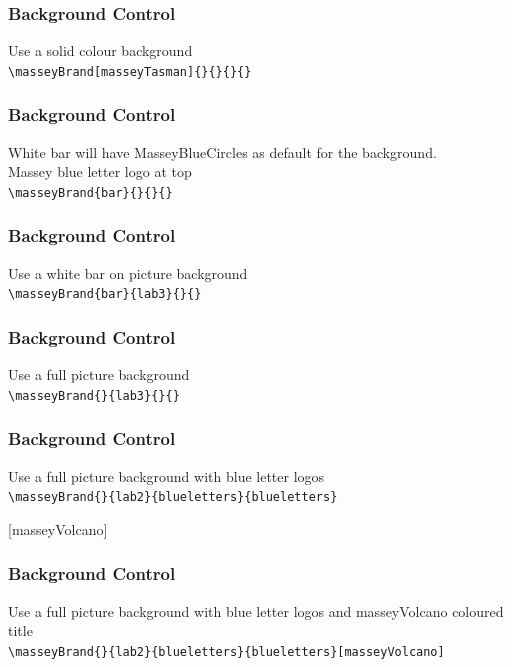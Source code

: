 \documentclass[10pt,aspectratio=169]{beamer}
\begin{document}
\begin{frame}[fragile]
\frametitle{Background Control}
Use a solid colour background \\[2ex]
\verb|\masseyBrand[masseyTasman]{}{}{}{}|

\end{frame}


\begin{frame}[fragile]
\frametitle{Background Control}
White bar will have MasseyBlueCircles as default for the background.\\
Massey blue letter logo at top\\[2ex]
\verb|\masseyBrand{bar}{}{}{}|
\end{frame}


\begin{frame}[fragile]
\frametitle{Background Control}
Use a white bar on picture background\\[2ex]
\verb|\masseyBrand{bar}{lab3}{}{}|
\end{frame}


\begin{frame}[fragile]
\frametitle{Background Control}
Use a full picture background\\[2ex]
\verb|\masseyBrand{}{lab3}{}{}|
\end{frame}


\begin{frame}[fragile]
\frametitle{Background Control}
Use a full picture background with blue letter logos\\[2ex]
\verb|\masseyBrand{}{lab2}{blueletters}{blueletters}|
\end{frame}

[masseyVolcano]

\begin{frame}[fragile]
\frametitle{Background Control}
Use a full picture background with blue letter logos and masseyVolcano coloured title \\[2ex]
\verb|\masseyBrand{}{lab2}{blueletters}{blueletters}[masseyVolcano]|

\end{frame}
\end{document}

